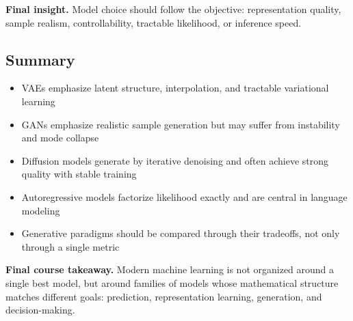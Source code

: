 \medskip

\noindent
\textbf{Final insight.}  
Model choice should follow the objective: representation quality, sample realism, controllability, tractable likelihood, or inference speed.

\subsection{Summary}

\begin{itemize}
    \item VAEs emphasize latent structure, interpolation, and tractable variational learning
    \item GANs emphasize realistic sample generation but may suffer from instability and mode collapse
    \item Diffusion models generate by iterative denoising and often achieve strong quality with stable training
    \item Autoregressive models factorize likelihood exactly and are central in language modeling
    \item Generative paradigms should be compared through their tradeoffs, not only through a single metric
\end{itemize}

\medskip

\noindent
\textbf{Final course takeaway.}  
Modern machine learning is not organized around a single best model, but around families of models whose mathematical structure matches different goals: prediction, representation learning, generation, and decision-making.
